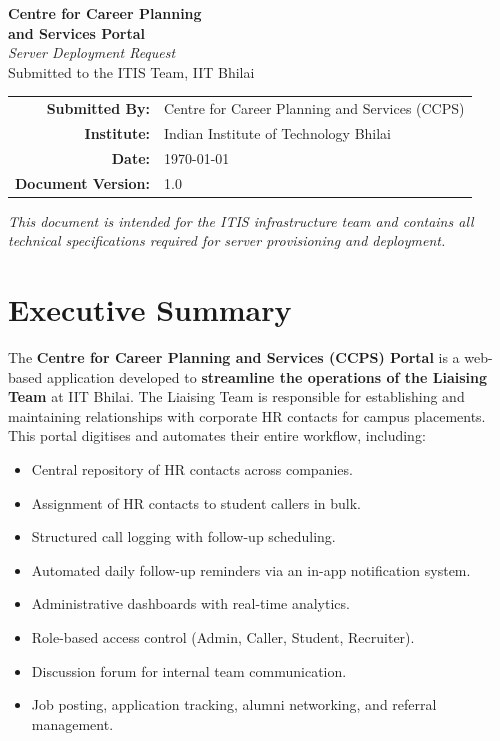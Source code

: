 \documentclass[12pt,a4paper]{article}
\begin{document}
\begin{titlepage}
    \centering
    \vspace*{2cm}
    
    {\Huge\bfseries Centre for Career Planning\\[4pt] and Services Portal}\\[1.2cm]
    {\LARGE\textit{Server Deployment Request}}\\[0.3cm]
    {\large Submitted to the ITIS Team, IIT Bhilai}\\[2.5cm]
    
    \begin{tabular}{rl}
        \textbf{Submitted By:}  & Centre for Career Planning and Services (CCPS) \\
        \textbf{Institute:}     & Indian Institute of Technology Bhilai \\
        \textbf{Date:}          & \today \\
        \textbf{Document Version:} & 1.0 \\
    \end{tabular}
    
    \vfill
    {\small\textit{This document is intended for the ITIS infrastructure team and contains all technical specifications required for server provisioning and deployment.}}
\end{titlepage}

\tableofcontents
\newpage

\section{Executive Summary}

The \textbf{Centre for Career Planning and Services (CCPS) Portal} is a web-based application developed to \textbf{streamline the operations of the Liaising Team} at IIT Bhilai. The Liaising Team is responsible for establishing and maintaining relationships with corporate HR contacts for campus placements. This portal digitises and automates their entire workflow, including:

\begin{itemize}[nosep]
    \item Central repository of HR contacts across companies.
    \item Assignment of HR contacts to student callers in bulk.
    \item Structured call logging with follow-up scheduling.
    \item Automated daily follow-up reminders via an in-app notification system.
    \item Administrative dashboards with real-time analytics.
    \item Role-based access control (Admin, Caller, Student, Recruiter).
    \item Discussion forum for internal team communication.
    \item Job posting, application tracking, alumni networking, and referral management.
\end{itemize}
\end{document}
